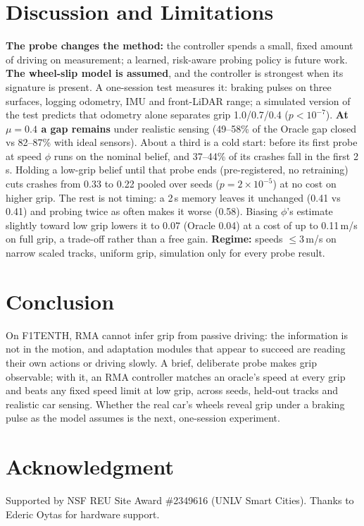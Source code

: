 \documentclass[conference]{IEEEtran}
\newcommand{\phiA}{\ensuremath{\phi}}
\begin{document}
\section{Discussion and Limitations}
\textbf{The probe changes the method:} the controller spends a small, fixed amount of driving on measurement; a learned, risk-aware probing policy is future work.
\textbf{The wheel-slip model is assumed}, and the controller is strongest when its signature is present. A one-session test measures it: braking pulses on three surfaces, logging odometry, IMU and front-LiDAR range; a simulated version of the test predicts that odometry alone separates grip 1.0/0.7/0.4 ($p<10^{-7}$).
\textbf{At $\mu\!=\!0.4$ a gap remains} under realistic sensing (49--58\% of the Oracle gap closed vs 82--87\% with ideal sensors). About a third is a cold start: before its first probe at speed \phiA{} runs on the nominal belief, and 37--44\% of its crashes fall in the first 2\,s. Holding a low-grip belief until that probe ends (pre-registered, no retraining) cuts crashes from 0.33 to 0.22 pooled over seeds ($p\!=\!2\!\times\!10^{-5}$) at no cost on higher grip. The rest is not timing: a 2\,s memory leaves it unchanged (0.41 vs 0.41) and probing twice as often makes it worse (0.58). Biasing \phiA{}'s estimate slightly toward low grip lowers it to 0.07 (Oracle 0.04) at a cost of up to 0.11\,m/s on full grip, a trade-off rather than a free gain.
\textbf{Regime:} speeds $\le$3\,m/s on narrow scaled tracks, uniform grip, simulation only for every probe result.

\section{Conclusion}
On F1TENTH, RMA cannot infer grip from passive driving: the information is not in the motion, and adaptation modules that appear to succeed are reading their own actions or driving slowly. A brief, deliberate probe makes grip observable; with it, an RMA controller matches an oracle's speed at every grip and beats any fixed speed limit at low grip, across seeds, held-out tracks and realistic car sensing. Whether the real car's wheels reveal grip under a braking pulse as the model assumes is the next, one-session experiment.

\section*{Acknowledgment}
Supported by NSF REU Site Award \#2349616 (UNLV Smart Cities). Thanks to Ederic Oytas for hardware support.



\end{document}
